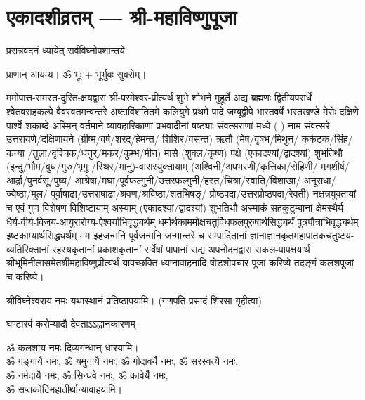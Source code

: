 
\setlength{\parindent}{0pt}

\section[एकादशीव्रतम्]{एकादशीव्रतम् — श्री-महाविष्णुपूजा}




{प्रसन्नवदनं ध्यायेत् सर्वविघ्नोपशान्तये}
 
प्राणान्  आयम्य।  ॐ भूः + भूर्भुवः॒ सुव॒रोम्।


ममोपात्त-समस्त-दुरित-क्षयद्वारा श्री-परमेश्वर-प्रीत्यर्थं शुभे शोभने मुहूर्ते अद्य ब्रह्मणः
द्वितीयपरार्धे श्वेतवराहकल्पे वैवस्वतमन्वन्तरे अष्टाविंशतितमे कलियुगे प्रथमे पादे
जम्बूद्वीपे भारतवर्षे भरतखण्डे मेरोः दक्षिणे पार्श्वे शकाब्दे अस्मिन् वर्तमाने व्यावहारिकाणां प्रभवादीनां षष्ट्याः संवत्सराणां मध्ये (	) नाम संवत्सरे उत्तरायणे/दक्षिणायने 
(ग्रीष्म/वर्ष/शरद्/हेमन्त/ शिशिर/वसन्त) ऋतौ  (मेष/वृषभ/मिथुन/
कर्कटक/सिंह/कन्या /तुला/वृश्चिक/धनुर्/मकर/कुम्भ/मीन) मासे 
(शुक्ल/कृष्ण) पक्षे (एकादश्यां/द्वादश्यां) शुभतिथौ
(इन्दु/भौम/बुध/गुरु/भृगु /स्थिर/भानु)-वासरयुक्तायाम्
(अश्विनी/अपभरणी/कृत्तिका/रोहिणी/ मृगशीर्ष/आर्द्रा/पुनर्वसू/पुष्य/
आश्रेषा/मघा/पूर्वफल्गुनी/उत्तर\-फल्गुनी/हस्त/चित्रा/स्वाति/विशाखा/
अनूराधा/ज्येष्ठा/मूल/ पूर्वाषाढा/उत्तराषाढा/श्रवण/श्रविष्ठा/शतभिषङ्/
प्रोष्ठपदा/उत्तर\-प्रोष्ठपदा/रेवती) नक्षत्रयुक्तायां च एवं गुण विशेषण विशिष्टायाम्
अस्याम् (एकादश्यां/द्वादश्यां) शुभतिथौ 
अस्माकं सहकुटुम्बानां क्षेमस्थैर्य-धैर्य-वीर्य-विजय-आयुरारोग्य-ऐश्वर्याभिवृद्ध्यर्थम्
 धर्मार्थकाममोक्ष\-चतुर्विधफलपुरुषार्थसिद्ध्यर्थं पुत्रपौत्राभिवृद्ध्यर्थम् इष्टकाम्यार्थसिद्ध्यर्थम्
मम इहजन्मनि पूर्वजन्मनि जन्मान्तरे च सम्पादितानां ज्ञानाज्ञानकृतमहा\-पातकचतुष्टय-व्यतिरिक्तानां रहस्यकृतानां प्रकाशकृतानां सर्वेषां पापानां सद्य अपनोदनद्वारा सकल-पापक्षयार्थं श्रीभूमिनीलासमेतश्रीमहाविष्णुप्रीत्यर्थं यावच्छक्ति-ध्यानावाहनादि-षोडशोपचार-पूजां करिष्ये तदङ्गं कलशपूजां च करिष्ये।


श्रीविघ्नेश्वराय नमः यथास्थानं प्रतिष्ठापयामि।
(गणपति-प्रसादं शिरसा गृहीत्वा)



{घण्टारवं करोम्यादौ देवताऽऽह्वानकारणम्}

ॐ कलशाय नमः दिव्यगन्धान् धारयामि।\\
ॐ गङ्गायै नमः, ॐ यमुनायै नमः, ॐ गोदावर्यै नमः,  ॐ सरस्वत्यै नमः,\\ ॐ नर्मदायै नमः, ॐ सिन्धवे नमः, ॐ कावेर्यै नमः,\\
 ॐ सप्तकोटिमहातीर्थान्यावाहयामि। \\

